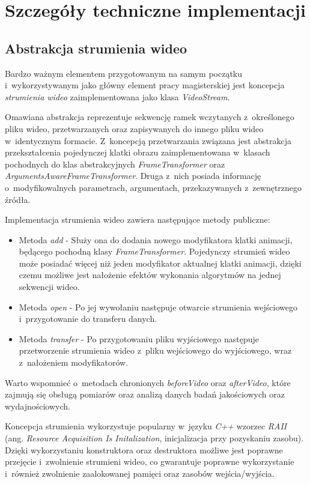   \section{Szczegóły techniczne implementacji}\label{Section_ImplementationDetails}

  \subsection{Abstrakcja strumienia wideo}
  Bardzo ważnym elementem przygotowanym na samym początku i~wykorzystywanym jako główny element pracy magisterskiej jest koncepcja \textit{strumienia wideo} zaimplementowana jako klasa \textit{VideoStream}.

  Omawiana abstrakcja reprezentuje sekwencję ramek wczytanych z~określonego pliku wideo, przetwarzanych oraz zapisywanych do innego pliku wideo w~identycznym formacie. Z~koncepcją przetwarzania związana jest abstrakcja przekształcenia pojedynczej klatki obrazu zaimplementowana w~klasach pochodnych do klas abstrakcyjnych \textit{FrameTransformer} oraz \textit{ArgumentsAwareFrameTransformer}. Druga z~nich posiada informację o~modyfikowalnych parametrach, argumentach, przekazywanych z~zewnętrznego źródła.

  Implementacja strumienia wideo zawiera następujące metody publiczne:
  \begin{itemize}
    \item Metoda \textit{add} - Służy ona do dodania nowego modyfikatora klatki animacji, będącego pochodną klasy \textit{FrameTransformer}. Pojedynczy strumień wideo może posiadać więcej niż jeden modyfikator aktualnej klatki animacji, dzięki czemu możliwe jest nałożenie efektów wykonania algorytmów na jednej sekwencji wideo.
    \item Metoda \textit{open} - Po jej wywołaniu następuje otwarcie strumienia wejściowego i~przygotowanie do transferu danych.
    \item Metoda \textit{transfer} - Po przygotowaniu pliku wyjściowego następuje przetworzenie strumienia wideo z~pliku wejściowego do wyjściowego, wraz z~nałożeniem modyfikatorów.
  \end{itemize}

  Warto wspomnieć o~metodach chronionych \textit{beforeVideo} oraz \textit{afterVideo}, które zajmują się obsługą pomiarów oraz analizą danych badań jakościowych oraz wydajnościowych.

  Koncepcja strumienia wykorzystuje popularny w~języku \textit{C++} wzorzec \textit{RAII} (ang. \textit{Resource Acquisition Is Initalization}, inicjalizacja przy pozyskaniu zasobu). Dzięki wykorzystaniu konstruktora oraz destruktora możliwe jest poprawne przejęcie i~zwolnienie strumieni wideo, co gwarantuje poprawne wykorzystanie i~również zwolnienie zaalokowanej pamięci oraz zasobów wejścia/wyjścia.

